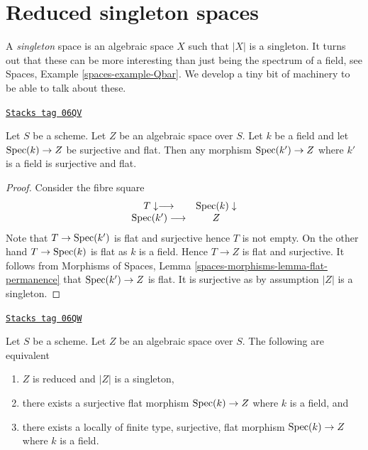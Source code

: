 \section{Reduced singleton spaces}
\label{decent-spaces-section-singleton}
A {\it singleton} space is an algebraic space $X$ such that $|X|$ is
a singleton. It turns out that these can be more interesting than
just being the spectrum of a field, see
Spaces, Example \ref{spaces-example-Qbar}.
We develop a tiny bit of machinery to be able to talk about these.

\begin{lemma}
\label{decent-spaces-lemma-flat-cover-by-field}
\href{https://stacks.math.columbia.edu/tag/06QV}{\texttt{Stacks tag 06QV}}

Let $S$ be a scheme. Let $Z$ be an algebraic space over $S$.
Let $k$ be a field and let $\operatorname{Spec}(k) \to Z$ be surjective and flat.
Then any morphism $\operatorname{Spec}(k') \to Z$ where $k'$ is a field is
surjective and flat.
\end{lemma}

\begin{proof}
Consider the fibre square
$$
\begin{array}{cc}T \downarrow\longrightarrow & \operatorname{Spec}(k) \downarrow \\ \operatorname{Spec}(k') \longrightarrow & Z\end{array}
$$
Note that $T \to \operatorname{Spec}(k')$ is flat and surjective hence $T$
is not empty. On the other hand $T \to \operatorname{Spec}(k)$ is flat as
$k$ is a field. Hence $T \to Z$ is flat and surjective.
It follows from
Morphisms of Spaces, Lemma \ref{spaces-morphisms-lemma-flat-permanence}
that $\operatorname{Spec}(k') \to Z$ is flat. It is surjective as by assumption
$|Z|$ is a singleton.
\end{proof}

\begin{lemma}
\label{decent-spaces-lemma-unique-point}
\href{https://stacks.math.columbia.edu/tag/06QW}{\texttt{Stacks tag 06QW}}

Let $S$ be a scheme.
Let $Z$ be an algebraic space over $S$. The following are equivalent
\begin{enumerate}
\item $Z$ is reduced and $|Z|$ is a singleton,
\item there exists a surjective flat morphism $\operatorname{Spec}(k) \to Z$
where $k$ is a field, and
\item there exists a locally of finite type, surjective, flat morphism
$\operatorname{Spec}(k) \to Z$ where $k$ is a field.
\end{enumerate}
\end{lemma}

